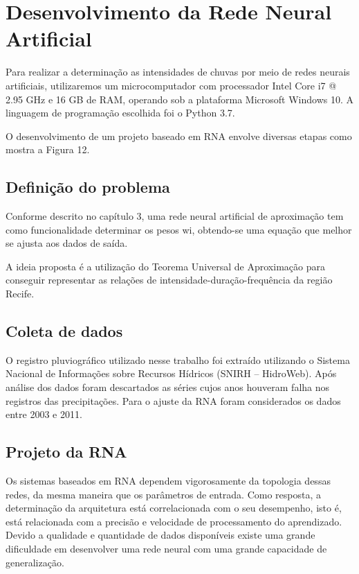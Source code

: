 \section{Desenvolvimento da Rede Neural Artificial}

Para realizar a determinação as intensidades de chuvas por meio de redes neurais artificiais, utilizaremos um microcomputador com processador Intel Core i7 @ 2.95 GHz e 16 GB de RAM, operando sob a plataforma Microsoft Windows 10. A linguagem de programação escolhida foi o Python 3.7.

O desenvolvimento de um projeto baseado em RNA envolve diversas etapas como mostra a Figura 12. 

\subsection{Definição do problema}

Conforme descrito no capítulo 3, uma rede neural artificial de aproximação tem como funcionalidade determinar os pesos wi, obtendo-se uma equação que melhor se ajusta aos dados de saída.

A ideia proposta é a utilização do Teorema Universal de Aproximação para conseguir representar as relações de intensidade-duração-frequência da região Recife.

\subsection{Coleta de dados}

O registro pluviográfico utilizado nesse trabalho foi extraído utilizando o Sistema Nacional de Informações sobre Recursos Hídricos (SNIRH – HidroWeb). Após análise dos dados foram descartados as séries cujos anos houveram falha nos registros das precipitações. Para o ajuste da RNA foram considerados os dados entre 2003 e 2011.

\subsection{Projeto da RNA}

Os sistemas baseados em RNA dependem vigorosamente da topologia dessas redes, da mesma maneira que os parâmetros de entrada. Como resposta, a determinação da arquitetura está correlacionada com o seu desempenho, isto é, está relacionada com a precisão e velocidade de processamento do aprendizado. Devido a qualidade e quantidade de dados disponíveis existe uma grande dificuldade em desenvolver uma rede neural com uma grande capacidade de generalização.

